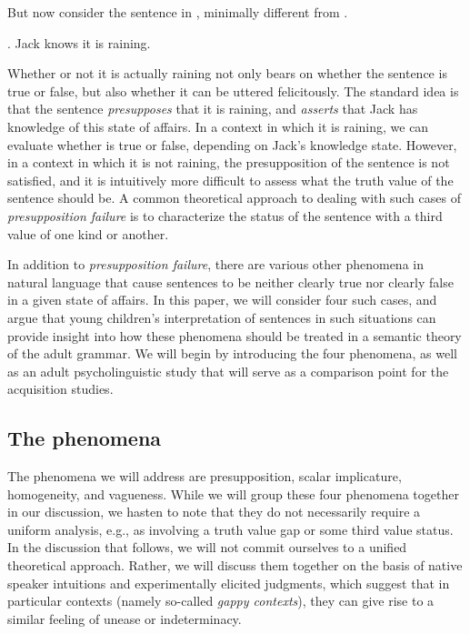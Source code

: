 \documentclass[12pt, letterpaper]{article}
\begin{document}
But now consider the sentence in \Next, minimally different from \Last.

\ex. Jack knows it is raining.

Whether or not it is actually raining not only bears on whether the sentence is true or false, but also whether it can be uttered felicitously. The standard idea is that the sentence \textit{presupposes} that it is raining, and \textit{asserts} that Jack has knowledge of this state of affairs. In a context in which it is raining, we can evaluate whether \Last is true or false, depending on Jack's knowledge state. However, in a context in which it is not raining, the presupposition of the sentence is not satisfied, and it is intuitively more difficult to assess what the truth value of the sentence should be. A common theoretical approach to dealing with such cases of {\it presupposition failure} is to characterize the status of the sentence with a third value of one kind or another. 

In addition to \textit{presupposition failure}, there are various other phenomena in natural language that cause sentences to be neither clearly true nor clearly false in a given state of affairs. In this paper, we will consider four such cases, and argue that young children's interpretation of sentences in such situations can provide insight into how these phenomena should be treated in a semantic theory of the adult grammar. We will begin by introducing the four phenomena, as well as an adult psycholinguistic study that will serve as a comparison point for the acquisition studies. 

\subsection{The phenomena}\label{phenomena}

The phenomena we will address are presupposition, scalar implicature, homogeneity, and vagueness. While we will group these four phenomena together in our discussion, we hasten to note that they do not necessarily require a uniform analysis, e.g., as involving a truth value gap or some third value status. In the discussion that follows, we will not commit ourselves to a unified theoretical approach. Rather, we will discuss them together on the basis of native speaker intuitions and experimentally elicited judgments, which suggest that in particular contexts (namely so-called \textit{gappy contexts}), they can give rise to a similar feeling of unease or indeterminacy. 
\end{document}
